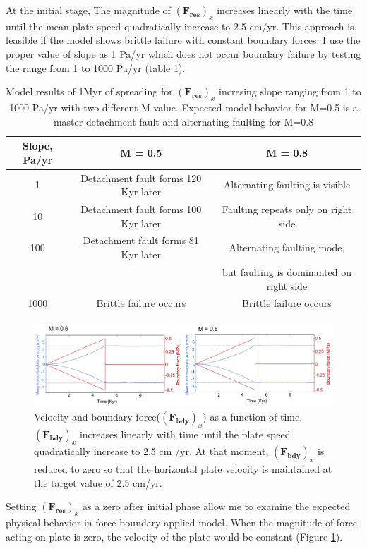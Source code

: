 \documentclass[letterpaper,12pt,notitle]{memphisthesis}                     %
\begin{document}
At the initial stage, The magnitude of $(\boldsymbol{F_{res}})_x$ increases linearly with the time until the mean plate speed quadratically increase to 2.5 cm/yr. This approach is feasible if the model shows brittle failure with constant boundary forces. I use the proper value of slope as 1 Pa/yr which does not occur boundary failure by testing the range from 1 to 1000 Pa/yr (table \ref{tab:slope}). 
%
\begin{table}[h!]
	\centering
	\caption{Model results of 1Myr of spreading for $(\boldsymbol{F_{res}})_x$ incresing slope ranging from 1 to 1000 Pa/yr with two different M value. Expected model behavior for M=0.5 is a master detachment fault and alternating faulting for M=0.8}
	\label{tab:slope}
	\begin{tabular}{ccc}
		\toprule
		Slope, Pa/yr & M = 0.5 & M = 0.8\\
		\midrule
          	1 & Detachment fault forms 120 Kyr later & Alternating faulting is visible\\
		10 & Detachment fault forms 100 Kyr later & Faulting repeats only on right side\\
		100 & Detachment fault forms 81 Kyr later & Alternating faulting mode, \\
		&&but faulting is dominanted on right side\\
		1000 & Brittle failure occurs & Brittle failure occurs\\
		\bottomrule
	\end{tabular}
\end{table}
%
\begin{figure}[!htb]
	\centering
	\includegraphics[width=0.99\linewidth]{./figs/force0.pdf}
	\caption{Velocity and boundary force($(\boldsymbol{F_{bdy}})_x$) as a function of time. $(\boldsymbol{F_{bdy}})_x$ increases linearly with time until the plate speed quadratically increase to 2.5 cm /yr. At that moment, $(\boldsymbol{F_{bdy}})_x$ is reduced to zero so that the horizontal plate velocity is maintained at the target value of 2.5 cm/yr.}
	\label{fig:force0}
\end{figure}

Setting $(\boldsymbol{F_{res}})_x$ as a zero after initial phase allow me to examine the expected physical behavior in force boundary applied model. When the magnitude of force acting on plate is zero, the velocity of the plate would be constant (Figure \ref{fig:force0}).
\end{document}
